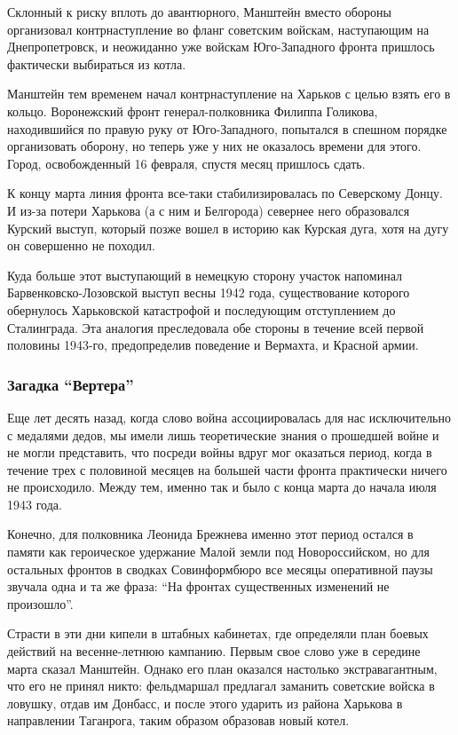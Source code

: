 
Склонный к риску вплоть до авантюрного, Манштейн вместо обороны организовал
контрнаступление во фланг советским войскам, наступающим на Днепропетровск, и
неожиданно уже войскам Юго-Западного фронта пришлось фактически выбираться из
котла.

Манштейн тем временем начал контрнаступление на Харьков с целью взять его в
кольцо. Воронежский фронт генерал-полковника Филиппа Голикова, находившийся по
правую руку от Юго-Западного, попытался в спешном порядке организовать оборону,
но теперь уже у них не оказалось времени для этого. Город, освобожденный 16
февраля, спустя месяц пришлось сдать.

К концу марта линия фронта все-таки стабилизировалась по Северскому Донцу. И
из-за потери Харькова (а с ним и Белгорода) севернее него образовался Курский
выступ, который позже вошел в историю как Курская дуга, хотя на дугу он
совершенно не походил.

Куда больше этот выступающий в немецкую сторону участок напоминал
Барвенковско-Лозовской выступ весны 1942 года, существование которого
обернулось Харьковской катастрофой и последующим отступлением до Сталинграда.
Эта аналогия преследовала обе стороны в течение всей первой половины 1943-го,
предопределив поведение и Вермахта, и Красной армии.

\subsubsection{Загадка \enquote{Вертера}}

Еще лет десять назад, когда слово война ассоциировалась для нас исключительно с
медалями дедов, мы имели лишь теоретические знания о прошедшей войне и не могли
представить, что посреди войны вдруг мог оказаться период, когда в течение трех
с половиной месяцев на большей части фронта практически ничего не происходило.
Между тем, именно так и было с конца марта до начала июля 1943 года.

Конечно, для полковника Леонида Брежнева именно этот период остался в памяти
как героическое удержание Малой земли под Новороссийском, но для остальных
фронтов в сводках Совинформбюро все месяцы оперативной паузы звучала одна и та
же фраза: \enquote{На фронтах существенных изменений не произошло}.

Страсти в эти дни кипели в штабных кабинетах, где определяли план боевых
действий на весенне-летнюю кампанию. Первым свое слово уже в середине марта
сказал Манштейн. Однако его план оказался настолько экстравагантным, что его не
принял никто: фельдмаршал предлагал заманить советские войска в ловушку, отдав
им Донбасс, и после этого ударить из района Харькова в направлении Таганрога,
таким образом образовав новый котел.


